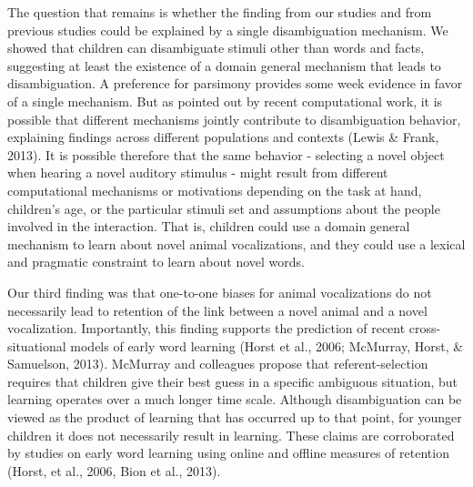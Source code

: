 \documentclass[english,floatsintext,man]{apa6}
\theoremstyle{definition}
\theoremstyle{definition}
\theoremstyle{definition}
\theoremstyle{remark}
\begin{document}
The question that remains is whether the finding from our studies and
from previous studies could be explained by a single disambiguation
mechanism. We showed that children can disambiguate stimuli other than
words and facts, suggesting at least the existence of a domain general
mechanism that leads to disambiguation. A preference for parsimony
provides some week evidence in favor of a single mechanism. But as
pointed out by recent computational work, it is possible that different
mechanisms jointly contribute to disambiguation behavior, explaining
findings across different populations and contexts (Lewis \& Frank,
2013). It is possible therefore that the same behavior - selecting a
novel object when hearing a novel auditory stimulus - might result from
different computational mechanisms or motivations depending on the task
at hand, children's age, or the particular stimuli set and assumptions
about the people involved in the interaction. That is, children could
use a domain general mechanism to learn about novel animal
vocalizations, and they could use a lexical and pragmatic constraint to
learn about novel words.

Our third finding was that one-to-one biases for animal vocalizations do
not necessarily lead to retention of the link between a novel animal and
a novel vocalization. Importantly, this finding supports the prediction
of recent cross-situational models of early word learning (Horst et al.,
2006; McMurray, Horst, \& Samuelson, 2013). McMurray and colleagues
propose that referent-selection requires that children give their best
guess in a specific ambiguous situation, but learning operates over a
much longer time scale. Although disambiguation can be viewed as the
product of learning that has occurred up to that point, for younger
children it does not necessarily result in learning. These claims are
corroborated by studies on early word learning using online and offline
measures of retention (Horst, et al., 2006, Bion et al., 2013).
\end{document}
